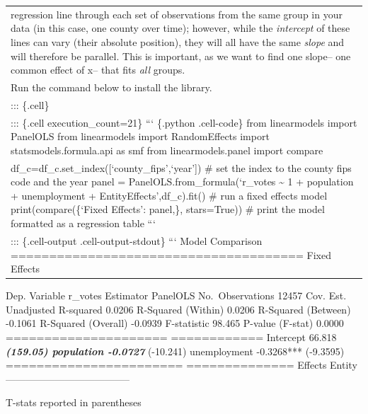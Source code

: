 \documentclass[
  letterpaper,
  DIV=11,
  numbers=noendperiod]{scrreprt}
\begin{document}
\begin{longtable}[]{@{}
  >{\raggedright\arraybackslash}p{}@{}}
regression line through each set of observations from the same group in
your data (in this case, one county over time); however, while the
\emph{intercept} of these lines can vary (their absolute position), they
will all have the same \emph{slope} and will therefore be parallel. This
is important, as we want to find one slope-- one common effect of x--
that fits \emph{all} groups. \\
Run the command below to install the library. \\
::: \{.cell\} \\
::: \{.cell execution\_count=21\} ``` \{.python .cell-code\} from
linearmodels import PanelOLS from linearmodels import RandomEffects
import statsmodels.formula.api as smf from linearmodels.panel import
compare \\
df\_c=df\_c.set\_index({[}`county\_fips',`year'{]}) \# set the index to
the county fips code and the year panel =
PanelOLS.from\_formula(`r\_votes \textasciitilde{} 1 + population +
unemployment + EntityEffects',df\_c).fit() \# run a fixed effects model
print(compare(\{`Fixed Effects': panel,\}, stars=True)) \# print the
model formatted as a regression table ``` \\
::: \{.cell-output .cell-output-stdout\} ``` Model Comparison
====================================== Fixed Effects \\
\end{longtable}

Dep. Variable r\_votes Estimator PanelOLS No.~Observations 12457 Cov.
Est. Unadjusted R-squared 0.0206 R-Squared (Within) 0.0206 R-Squared
(Between) -0.1061 R-Squared (Overall) -0.0939 F-statistic 98.465 P-value
(F-stat) 0.0000 ===================== ============ Intercept
66.818\textbf{\emph{ (159.05) population -0.0727}} (-10.241)
unemployment -0.3268*** (-9.3595) ======================= ==============
Effects Entity --------------------------------------

T-stats reported in parentheses
\end{document}
